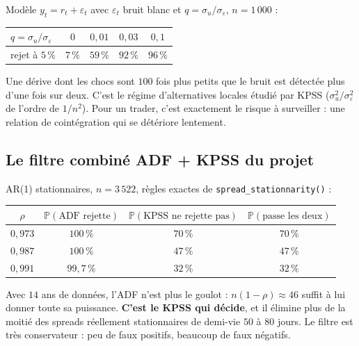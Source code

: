 \documentclass[11pt,a4paper]{article}
\newcommand{\code}[1]{\texttt{#1}}
\theoremstyle{definition}
\begin{document}
Modèle $y_t = r_t + \varepsilon_t$ avec $\varepsilon_t$ bruit blanc et $q = \sigma_u/\sigma_\varepsilon$, $n = 1\,000$ :

\begin{center}
\begin{tabular}{@{}lcccc@{}}
\toprule
$q = \sigma_u/\sigma_\varepsilon$ & $0$ & $0{,}01$ & $0{,}03$ & $0{,}1$ \\
\midrule
rejet à $5\,\%$ & $7\,\%$ & $59\,\%$ & $92\,\%$ & $96\,\%$ \\
\bottomrule
\end{tabular}
\end{center}

Une dérive dont les chocs sont $100$ fois plus petits que le bruit est détectée plus d'une fois sur deux. C'est le régime d'alternatives locales étudié par KPSS ($\sigma_u^2/\sigma_\varepsilon^2$ de l'ordre de $1/n^2$). Pour un trader, c'est exactement le risque à surveiller : une relation de cointégration qui se détériore lentement.

\subsection{Le filtre combiné ADF + KPSS du projet}

AR(1) stationnaires, $n = 3\,522$, règles exactes de \code{spread\_stationnarity()} :

\begin{center}
\begin{tabular}{@{}cccc@{}}
\toprule
$\rho$ & $\mathbb{P}(\text{ADF rejette})$ & $\mathbb{P}(\text{KPSS ne rejette pas})$ & $\mathbb{P}(\text{passe les deux})$ \\
\midrule
$0{,}973$ & $100\,\%$ & $70\,\%$ & $70\,\%$ \\
$0{,}987$ & $100\,\%$ & $47\,\%$ & $47\,\%$ \\
$0{,}991$ & $99{,}7\,\%$ & $32\,\%$ & $32\,\%$ \\
\bottomrule
\end{tabular}
\end{center}

\begin{retenir}
Avec $14$ ans de données, l'ADF n'est plus le goulot : $n(1-\rho) \approx 46$ suffit à lui donner toute sa puissance. \textbf{C'est le KPSS qui décide}, et il élimine plus de la moitié des spreads réellement stationnaires de demi-vie $50$ à $80$ jours. Le filtre est très conservateur : peu de faux positifs, beaucoup de faux négatifs.
\end{retenir}
\end{document}
